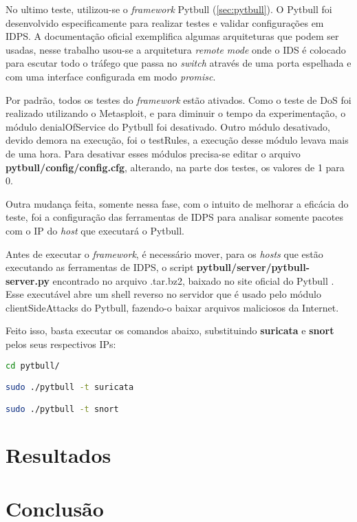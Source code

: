 No ultimo teste, utilizou-se o \textit{framework} Pytbull (\autoref{sec:pytbull}). O Pytbull foi desenvolvido especificamente para realizar testes e validar configurações em IDPS. A documentação oficial exemplifica algumas arquiteturas que podem ser usadas, nesse trabalho usou-se a arquitetura \textit{remote mode} onde o IDS é colocado para escutar todo o tráfego que passa no \textit{switch} através de uma porta espelhada e com uma interface configurada em modo \textit{promisc}.

Por padrão, todos os testes do \textit{framework} estão ativados. Como o teste de DoS foi realizado utilizando o Metasploit, e para diminuir o tempo da experimentação, o módulo denialOfService do Pytbull foi desativado. Outro módulo desativado, devido demora na execução, foi o testRules, a execução desse módulo levava mais de uma hora. Para desativar esses módulos precisa-se editar o arquivo \textbf{pytbull/config/config.cfg}, alterando, na parte dos testes, os valores de 1 para 0.

Outra mudança feita, somente nessa fase, com o intuito de melhorar a eficácia do teste, foi a configuração das ferramentas de IDPS para analisar somente pacotes com o IP do \textit{host} que executará o Pytbull. 

Antes de executar o \textit{framework}, é necessário mover, para os \textit{hosts} que estão executando as ferramentas de IDPS, o script \textbf{pytbull/server/pytbull-server.py} encontrado no arquivo .tar.bz2, baixado no site oficial do Pytbull \cite{pytbull}. Esse executável abre um shell reverso no servidor que é usado pelo módulo clientSideAttacks do Pytbull, fazendo-o baixar arquivos maliciosos da Internet. 

Feito isso, basta executar os comandos abaixo, substituindo \textbf{suricata} e \textbf{snort} pelos seus respectivos IPs:

\begin{lstlisting}[language=bash, frame=single]
cd pytbull/

sudo ./pytbull -t suricata

sudo ./pytbull -t snort
\end{lstlisting}

\section{Resultados} \label{sec:resultados}



\section{Conclusão} \label{sec:conclusão}
